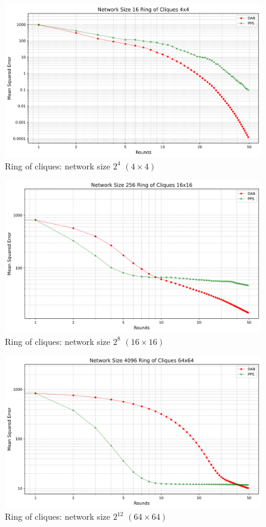 \begin{figure}[H]
    \centering
    \includegraphics[scale=0.5]{figures/ringOfCliquesSimulations/DAB_vs_PPS_RoC_r50_n16.png}
    \caption{Ring of cliques: network size $2^{4}$ $(4\times4)$}
    \label{fig:16ringOfCliques}
\end{figure}

\begin{figure}[H]
    \centering
    \includegraphics[scale=0.5]{figures/ringOfCliquesSimulations/DAB_vs_PPS_RoC_r50_n256.png}
    \caption{Ring of cliques: network size $2^{8}$ $(16\times16)$}
    \label{fig:256ringOfCliques}
\end{figure}

\begin{figure}[H]
    \centering
    \includegraphics[scale=0.5]{figures/ringOfCliquesSimulations/DAB_vs_PPS_RoC_r50_n4096.png}
    \caption{Ring of cliques: network size $2^{12}$ $(64\times64)$}
    \label{fig:4096ringOfCliques}
\end{figure}

